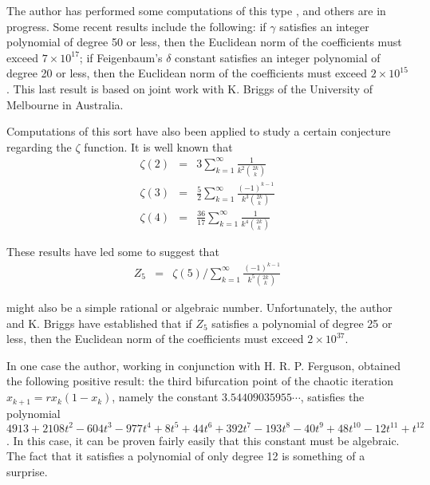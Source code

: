 The author has performed some computations of this type
\cite{dhb5,dhb6}, and others are in progress.  Some recent results
include the following: if $\gamma$ satisfies an integer polynomial of
degree 50 or less, then the Euclidean norm of the coefficients must
exceed $7 \times 10^{17}$; if Feigenbaum's $\delta$ constant satisfies
an integer polynomial of degree 20 or less, then the Euclidean norm of
the coefficients must exceed $2 \times 10^{15}$.  This last result is
based on joint work with K.  Briggs of the University of Melbourne in
Australia.

Computations of this sort have also been applied to study a certain
conjecture regarding the $\zeta$ function.  It is well known
\cite{borw2} that
\begin{eqnarray*} 
\zeta(2) &=& 3 \sum_{k=1}^{\infty} \frac{1} {k^2 {2k \choose k}} \\ 
\zeta(3) &=& \frac{5}{2} \sum_{k=1}^{\infty} \frac{(-1)^{k-1}}
   {k^3 {2k \choose k}} \\
\zeta(4) &=& \frac{36}{17} \sum_{k=1}^{\infty} \frac{1}
   {k^4 {2k \choose k}}
\end{eqnarray*}

\noindent
These results have led some to suggest that
\begin{eqnarray*}
Z_5 &=& \zeta(5) / \sum_{k=1}^{\infty} \frac{(-1)^{k-1}}
   {k^5 {2k \choose k}}
\end{eqnarray*}

\noindent 
might also be a simple rational or algebraic number.  Unfortunately,
the author and K. Briggs have established that if $Z_5$ satisfies a
polynomial of degree 25 or less, then the Euclidean norm of the
coefficients must exceed $2 \times 10^{37}$.

In one case the author, working in conjunction with H. R. P.
Ferguson, obtained the following positive result: the third
bifurcation point of the chaotic iteration $x_{k+1} = r x_k (1 -
x_k)$, namely the constant $3.54409035955 \cdots$, satisfies the
polynomial $4913 + 2108 t^2 - 604 t^3 - 977 t^4 + 8 t^5 + 44 t^6 + 392
t^7 - 193 t^8 - 40 t^9 + 48 t^{10} - 12 t^{11} + t^{12}$.  In this
case, it can be proven fairly easily that this constant must be
algebraic.  The fact that it satisfies a polynomial of only degree 12
is something of a surprise.

